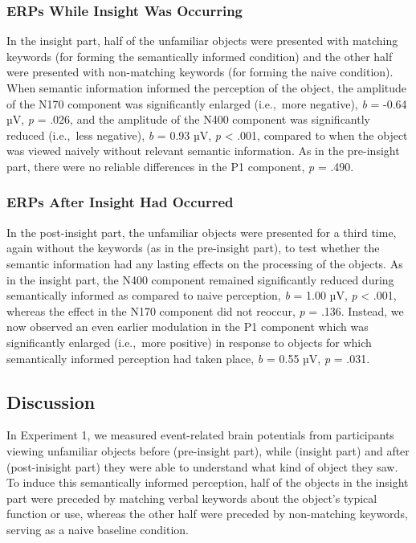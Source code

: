 \documentclass[
  english,
  doc,12pt,twoside,floatsintext]{apa7}
\begin{document}
\hypertarget{erps-while-insight-was-occurring}{%
\subsubsection{ERPs While Insight Was Occurring}\label{erps-while-insight-was-occurring}}

In the insight part, half of the unfamiliar objects were presented with matching keywords (for forming the semantically informed condition) and the other half were presented with non-matching keywords (for forming the naive condition). When semantic information informed the perception of the object, the amplitude of the N170 component was significantly enlarged (i.e.,~more negative), \emph{b} = -0.64 µV, \emph{p} = .026, and the amplitude of the N400 component was significantly reduced (i.e.,~less negative), \emph{b} = 0.93 µV, \emph{p} \textless{} .001, compared to when the object was viewed naively without relevant semantic information. As in the pre-insight part, there were no reliable differences in the P1 component, \emph{p} = .490.

\hypertarget{erps-after-insight-had-occurred}{%
\subsubsection{ERPs After Insight Had Occurred}\label{erps-after-insight-had-occurred}}

In the post-insight part, the unfamiliar objects were presented for a third time, again without the keywords (as in the pre-insight part), to test whether the semantic information had any lasting effects on the processing of the objects. As in the insight part, the N400 component remained significantly reduced during semantically informed as compared to naive perception, \emph{b} = 1.00 µV, \emph{p} \textless{} .001, whereas the effect in the N170 component did not reoccur, \emph{p} = .136. Instead, we now observed an even earlier modulation in the P1 component which was significantly enlarged (i.e.,~more positive) in response to objects for which semantically informed perception had taken place, \emph{b} = 0.55 µV, \emph{p} = .031.

\hypertarget{discussion}{%
\subsection{Discussion}\label{discussion}}

In Experiment 1, we measured event-related brain potentials from participants viewing unfamiliar objects before (pre-insight part), while (insight part) and after (post-inisight part) they were able to understand what kind of object they saw. To induce this semantically informed perception, half of the objects in the insight part were preceded by matching verbal keywords about the object's typical function or use, whereas the other half were preceded by non-matching keywords, serving as a naive baseline condition.
\end{document}
